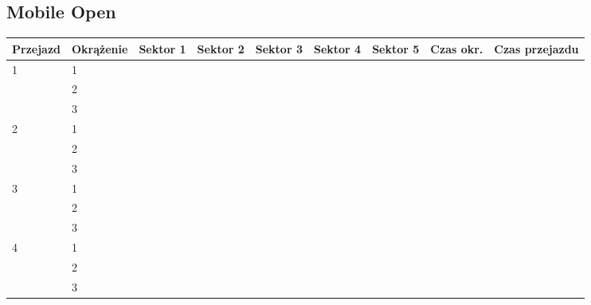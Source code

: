 \documentclass[11pt]{article}
\begin{document}
\subsection{Mobile Open}
\begin{table}[h]
\begin{tabular}{|l|l|l|l|l|l|l|l|l|}
\hline
   Przejazd        & Okrążenie & Sektor 1 & Sektor 2 & Sektor 3 & Sektor 4 & Sektor 5 & Czas okr. & Czas przejazdu    \\ \hline
\multirow{3}{*}{1} & 1         &          &          &          &          &          &           & \multirow{3}{*}{} \\ \cline{2-8}
                         & 2         &          &          &          &          &          &           &                    \\ \cline{2-8}
                         & 3         &          &          &          &          &          &           &                    \\ \hline
\multirow{3}{*}{2} & 1         &          &          &          &          &          &           & \multirow{3}{*}{} \\ \cline{2-8}
                         & 2         &          &          &          &          &          &           &                    \\ \cline{2-8}
                         & 3         &          &          &          &          &          &           &                    \\ \hline
\multirow{3}{*}{3} & 1         &          &          &          &          &          &           & \multirow{3}{*}{} \\ \cline{2-8}
                         & 2         &          &          &          &          &          &           &                    \\ \cline{2-8}
                         & 3         &          &          &          &          &          &           &                    \\ \hline
\multirow{3}{*}{4} & 1         &          &          &          &          &          &           & \multirow{3}{*}{} \\ \cline{2-8}
                         & 2         &          &          &          &          &          &           &                    \\ \cline{2-8}
                         & 3         &          &          &          &          &          &           &                    \\ \hline
\end{tabular}
\end{table}
\end{document}
